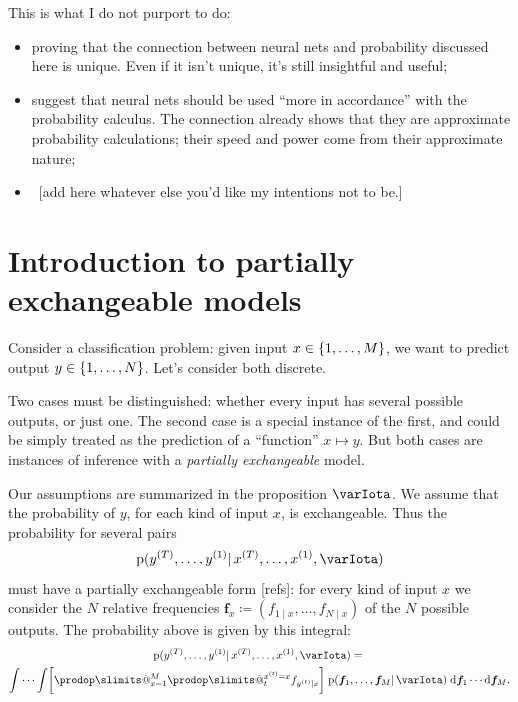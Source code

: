 \documentclass[\ifafour a4paper,12pt,\else a5paper,10pt,\fi%
onecolumn,oneside,article,%
british%
]{memoir}
\makeatletter
\theoremstyle{remark}
\theoremstyle{innote}
\def\prod{\DOTSI\prodop\slimits@}
\newcommand*{\di}{\mathrm{d}}%
\newcommand*{\defd}{\coloneqq}
\DeclarePairedDelimiter\set{\{}{\}}
\newcommand*{\pf}{\mathrm{p}}%
\renewcommand*{\|}{\mathpunct{|}}
\newcommand*{\yI}{\varIota}
\newcommand*{\yf}{\bm{f}}
\newcommand*{\xo}[1]{x^{(#1)}}
\newcommand*{\yo}[1]{y^{(#1)}}
\makeatother
\begin{document}
\medskip

This is what I do not purport to do:
\begin{itemize}[label=${}-{}$]
\item proving that the connection between neural nets and probability
  discussed here is unique. Even if it isn't unique, it's still insightful and
  useful;
\item suggest that neural nets should be used \enquote{more in accordance}
  with the probability calculus. The connection already shows that they are
  approximate probability calculations; their speed and power come from
  their approximate nature;
\item\ [add here whatever else you'd like my intentions not to be.]
\end{itemize}



\section{Introduction to partially exchangeable models}



Consider a classification problem: given input
$x \in \set{1,\dotsc, M}$, we want to predict output
$y \in \set{1,\dotsc,N}$. Let's consider both discrete.

Two cases must be distinguished: whether every input has several possible
outputs, or just one. The second case is a special instance of the first,
and could be simply treated as the prediction of a \enquote{function}
$x\mapsto y$. But both cases are instances of inference with a
\emph{partially exchangeable} model.


Our assumptions are summarized in the proposition $\yI$. We assume that the
probability of $y$, for each kind of input $x$, is exchangeable. Thus the
probability for several pairs
\begin{equation}
  \label{eq:prob_several_pairs}
  \pf(\yo{T},\dotsc, \yo{1} \|\xo{T}, \dotsc, \xo{1}, \yI)
\end{equation}
must have a partially exchangeable form [refs]: for every kind of input
$x$ we consider the $N$ relative frequencies
$\yf_x \defd (f_{1\|x},\dotsc, f_{N\|x})$ of the $N$ possible outputs. The
probability above is given by this integral:
\begin{multline}
  \label{eq:prob_several_pairs_exch}
  \pf(\yo{T},\dotsc, \yo{1} \|\xo{T}, \dotsc, \xo{1}, \yI)
  ={}\\
  \idotsint
  \biggl[ \prod_{x=1}^M \prod_t^{\xo{t}=x} f_{\yo{t}\|x} \biggr]
  \;
  \pf(\yf_1,\dotsc,\yf_M \| \yI)
  \;\di\yf_1 \dotsm \di\yf_M.
\end{multline}
\end{document}

